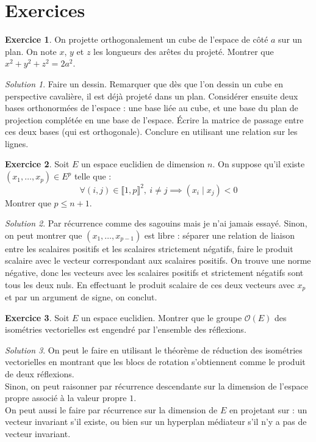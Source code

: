 \documentclass[french]{book}
\theoremstyle{definition}
\newtheorem{ex}{Exercice}[chapter]
\theoremstyle{remark}
\newtheorem*{sol}{Solution}
\begin{document}
\section{Exercices}

\begin{ex}
	On projette orthogonalement un cube de l'espace de côté $a$ sur un plan. On note $x$, $y$ et $z$ les longueurs des arêtes du projeté. Montrer que $x^2+y^2+z^2=2a^2$.
\end{ex}
\begin{sol}
	Faire un dessin. Remarquer que dès que l'on dessin un cube en perspective cavalière, il est déjà projeté dans un plan. Considérer ensuite deux bases orthonormées de l'espace : une base liée au cube, et une base du plan de projection complétée en une base de l'espace. Écrire la matrice de passage entre ces deux bases (qui est orthogonale). Conclure en utilisant une relation sur les lignes. 
\end{sol}

\begin{ex}
	Soit $E$ un espace euclidien de dimension $n$. On suppose qu'il existe $(x_1,\ldots,x_p)\in E^{p}$ telle que : $$\forall (i,j)\in\llbracket1,p\rrbracket^2,\ i\ne j\implies (x_i\mid x_j)<0$$ Montrer que $p\leqslant n+1$.
\end{ex}
\begin{sol}
	Par récurrence comme des sagouins mais je n'ai jamais essayé. Sinon, on peut montrer que $(x_1,\ldots,x_{p-1})$ est libre : séparer une relation de liaison entre les scalaires positifs et les scalaires strictement négatifs, faire le produit scalaire avec le vecteur correspondant aux scalaires positifs. On trouve une norme négative, donc les vecteurs avec les scalaires positifs et strictement négatifs sont tous les deux nuls. En effectuant le produit scalaire de ces deux vecteurs avec $x_p$ et par un argument de signe, on conclut.
\end{sol}

\begin{ex}
	Soit $E$ un espace euclidien. Montrer que le groupe $\mathcal{O}(E)$ des isométries vectorielles est engendré par l'ensemble des réflexions.
\end{ex}
\begin{sol}
	On peut le faire en utilisant le théorème de réduction des isométries vectorielles en montrant que les blocs de rotation s'obtiennent comme le produit de deux réflexions. \\
	Sinon, on peut raisonner par récurrence descendante sur la dimension de l'espace propre associé à la valeur propre $1$.\\
	On peut aussi le faire par récurrence sur la dimension de $E$ en projetant sur : un vecteur invariant s'il existe, ou bien sur un hyperplan médiateur s'il n'y a pas de vecteur invariant.
\end{sol}
\end{document}
